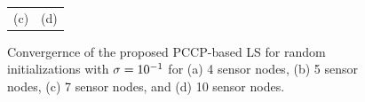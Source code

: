 \begin{figure}[t]
\begin{tabular}{cc}
  \\   (c) & (d)  
\end{tabular}
\caption{Convergernce of the proposed PCCP-based LS for random initializations with $\protect\sigma = 10\protect^{-1}$ for (a) 4 sensor nodes, (b) 5 sensor nodes, (c) 7 sensor nodes, and (d) 10 sensor nodes.} 
\end{figure}